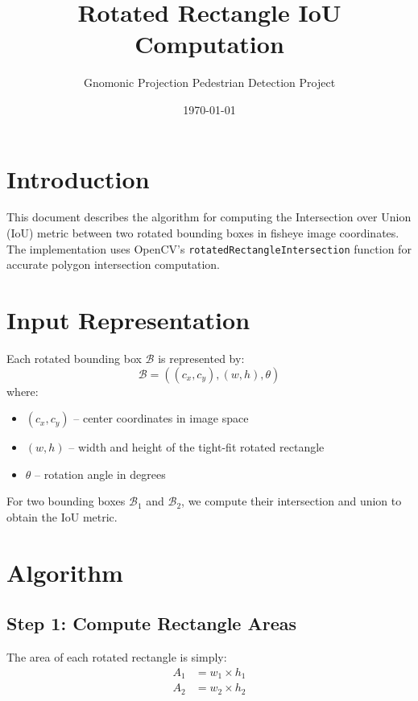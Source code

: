\documentclass[11pt]{article}
\title{Rotated Rectangle IoU Computation}
\author{Gnomonic Projection Pedestrian Detection Project}
\date{\today}
\begin{document}
\maketitle

\section{Introduction}

This document describes the algorithm for computing the Intersection over Union (IoU) metric between two rotated bounding boxes in fisheye image coordinates. The implementation uses OpenCV's \texttt{rotatedRectangleIntersection} function for accurate polygon intersection computation.

\section{Input Representation}

Each rotated bounding box $\mathcal{B}$ is represented by:
\begin{equation}
\mathcal{B} = \left( (c_x, c_y), (w, h), \theta \right)
\end{equation}
where:
\begin{itemize}[nosep]
    \item $(c_x, c_y)$ -- center coordinates in image space
    \item $(w, h)$ -- width and height of the tight-fit rotated rectangle
    \item $\theta$ -- rotation angle in degrees
\end{itemize}

For two bounding boxes $\mathcal{B}_1$ and $\mathcal{B}_2$, we compute their intersection and union to obtain the IoU metric.

\section{Algorithm}

\subsection{Step 1: Compute Rectangle Areas}

The area of each rotated rectangle is simply:
\begin{align}
A_1 &= w_1 \times h_1 \\
A_2 &= w_2 \times h_2
\end{align}
\end{document}

